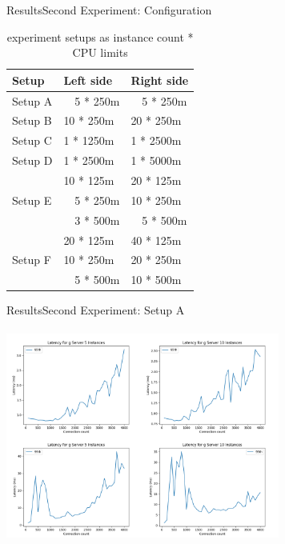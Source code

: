 \documentclass{beamer}
\begin{document}
\begin{frame}{Results}{Second Experiment: Configuration}
\begin{table}[h]
\centering
\begin{tabular}{ |l|l|l| }
\hline
Setup & Left side & Right side \\ \hline
Setup A &  ~~5 *  250m & ~~5 *  250m \\
Setup B & 10 *  250m &  20 *  250m \\
Setup C &  1 * 1250m &   1 * 2500m \\
Setup D &  1 * 2500m &   1 * 5000m \\ \hline
\multirow{3}{*}{Setup E} 
 & 10 *  125m & 20 *  125m \\
 &  ~~5 *  250m & 10 *  250m \\
 &  ~~3 *  500m & ~~5 *  500m \\ \hline
\multirow{3}{*}{Setup F}
 & 20 *  125m & 40 *  125m \\
 & 10 *  250m & 20 *  250m \\
 &  ~~5 *  500m & 10 *  500m \\ \hline
\end{tabular}
\caption{experiment setups as instance count * CPU limits}
\end{table}
\end{frame}


\begin{frame}{Results}{Second Experiment: Setup A}
  \begin{center}
   \includegraphics[height=7cm, width=9cm]{figures/g5_10.png}
  \end{center}
\end{frame}
\end{document}

